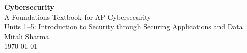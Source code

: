 \begin{titlepage}
\centering
\vspace*{2cm}
{\Huge\bfseries Cybersecurity}\\[1.5cm]
{\Large A Foundations Textbook for AP Cybersecurity}\\[0.5cm]
{\large Units 1--5: Introduction to Security through Securing Applications and Data}\\[2cm]
{\large Mitali Sharma}\\[3cm]
\vfill
{\large \today}
\end{titlepage}

